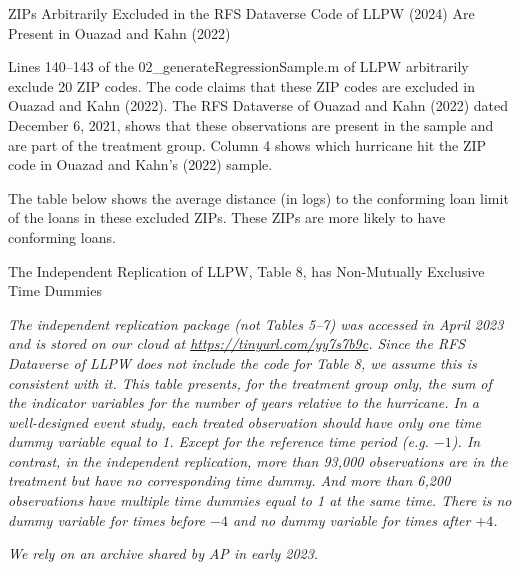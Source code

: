 \documentclass{article}
\begin{document}
\begin{table}
    
\caption{ZIPs Arbitrarily Excluded in the RFS Dataverse Code of LLPW (2024) Are Present in Ouazad and Kahn (2022)} 

Lines 140--143 of the 02\_generateRegressionSample.m of LLPW arbitrarily exclude 20 ZIP codes. The code claims that these ZIP codes are excluded in Ouazad and Kahn (2022). The RFS Dataverse of Ouazad and Kahn (2022) dated December 6, 2021, shows that these observations are present in the sample and are part of the treatment group. Column 4 shows which hurricane hit the ZIP code in Ouazad and Kahn's (2022) sample.

\bigskip

\begin{center}
    
\end{center}

\bigskip

The table below shows the average distance (in logs) to the conforming loan limit of the loans in these excluded ZIPs. These ZIPs are more likely to have conforming loans.

\bigskip

\begin{center}
    
\end{center}

\end{table}

\clearpage
\pagebreak

\begin{table}
\caption{The Independent Replication of LLPW, Table 8, has Non-Mutually Exclusive Time Dummies}

\emph{The independent replication package (not Tables 5--7) was accessed in April 2023 and is stored on our cloud at \url{https://tinyurl.com/yy7s7b9c}. Since the RFS Dataverse of LLPW does not include the code for Table 8, we assume this is consistent with it. This table presents, for the treatment group only, the sum of the indicator variables for the number of years relative to the hurricane. In a well-designed event study, each treated observation should have only one time dummy variable equal to 1. Except for the reference time period (e.g. $-1$). In contrast, in the independent replication, more than 93,000 observations are in the treatment but have no corresponding time dummy. And more than 6,200 observations have multiple time dummies equal to 1 at the same time. There is no dummy variable for times before $-4$ and no dummy variable for times after $+4$. }

\begin{center}

\end{center}

\emph{We rely on an archive shared by AP in early 2023.}

\end{table}
\end{document}
